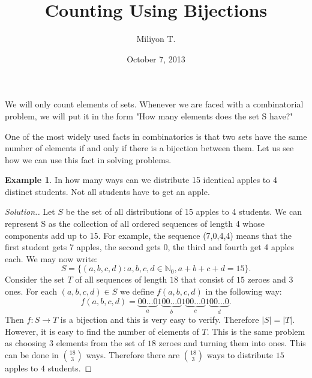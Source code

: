 \documentclass[11pt]{article}
\theoremstyle{definition}
\newtheorem{exmp}[thm]{Example}
\theoremstyle{plain}
\begin{document}
\nocite{}

\title{Counting Using Bijections}
\author{Miliyon T.}
\date{October 7, 2013}
\maketitle

We will only count elements of sets. Whenever we are faced with a combinatorial problem, we will put it in the form "How many elements does the set S have?"

One of the most widely used facts in combinatorics is that two sets have the same number of elements if and only if there is a bijection between them. Let us see how we can use this fact in solving problems.

\begin{exmp}
In how many ways can we distribute 15 identical apples to 4 distinct students. Not all students have to get an apple.
\end{exmp}
\begin{proof}[Solution.]
Let \( S \) be the set of all distributions of 15 apples to 4 students. We can represent S as the collection of all ordered sequences of length 4 whose components add up to 15. For example, the sequence (7,0,4,4) means that the first student gets 7 apples, the second gets 0, the third and fourth get 4 apples each. We may now write: \[ S=\{(a,b,c,d): a,b,c,d\in\mathbb N_0, a+b+c+d=15\}.\] Consider the set \( T \) of all sequences of length \( 18 \) that consist of \( 15 \) zeroes and \( 3 \) ones. For each \( (a,b,c,d)\in S \) we define \( f(a,b,c,d) \) in the following way: \[ f(a,b,c,d)=\underbrace{00\dots 0}_a1\underbrace{00\dots 0}_b1\underbrace{00\dots 0}_c1\underbrace{00\dots 0}_d.\] Then \( f:S\to T \) is a bijection and this is very easy to verify. Therefore \( |S|=|T| \). However, it is easy to find the number of elements of \( T \). This is the same problem as choosing \( 3 \) elements from the set of \( 18 \) zeroes and turning them into ones. This can be done in \( \binom{18}3 \) ways. Therefore there are \( \binom{18}3 \) ways to distribute \( 15 \) apples to \( 4 \) students.
\end{proof}
\end{document}
